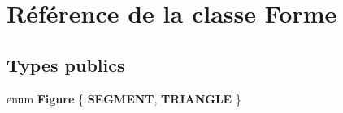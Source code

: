 \hypertarget{class_forme}{}\section{Référence de la classe Forme}
\label{class_forme}
\subsection*{Types publics}
\begin{DoxyCompactItemize}
\item 
\hypertarget{class_forme_a565573e96d8612399ee99f06f22787d8}{}enum {\bfseries Figure} \{ {\bfseries S\+E\+G\+M\+E\+N\+T}, 
{\bfseries T\+R\+I\+A\+N\+G\+L\+E}
 \}\label{class_forme_a565573e96d8612399ee99f06f22787d8}

\end{DoxyCompactItemize}
